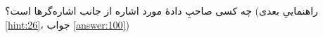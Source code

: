 \section{}
\paragraph{}\label{hint:86}
چه کسی صاحبِ دادهٔ مورد اشاره از جانب اشاره‌گرها است؟ (راهنماییِ بعدی \ref{hint:26}، جواب \ref{answer:100})